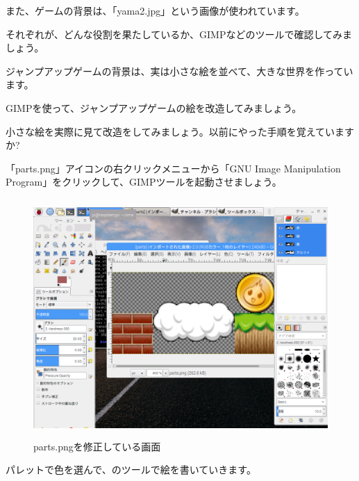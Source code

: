 また、ゲームの背景は、「yama2.jpg」という画像が使われています。

それぞれが、どんな役割を果たしているか、GIMPなどのツールで確認してみましょう。



\begin{description}
    \item {}
\end{description}



ジャンプアップゲームの背景は、実は小さな絵を並べて、大きな世界を作っています。

GIMPを使って、ジャンプアップゲームの絵を改造してみましょう。

小さな絵を実際に見て改造をしてみましょう。以前にやった手順を覚えていますか?

「parts.png」アイコンの右クリックメニューから「GNU Image Manipulation Program」をクリックして、GIMPツールを起動させましょう。


\begin{figure}[H]
    \begin{center}
      \includegraphics[keepaspectratio,width=12.065cm,height=9.049cm]{text04-img/s_gimpeditjumppart.png}
      \caption{parts.pngを修正している画面}
    \end{center}
    \label{fig:prog_menu}
\end{figure}

パレットで色を選んで、のツールで絵を書いていきます。


